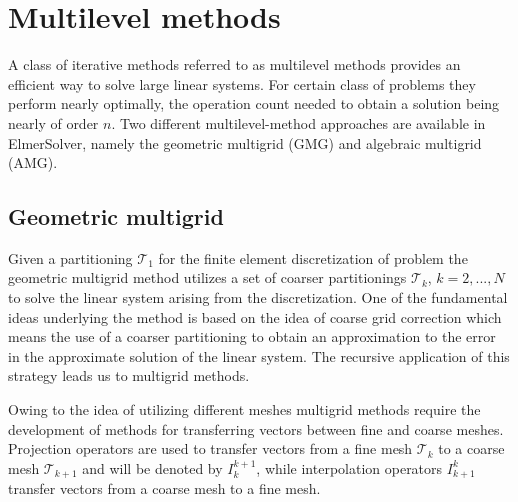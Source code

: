 


\section{Multilevel methods}

A class of iterative methods referred to as multilevel methods provides an efficient
way to solve large linear systems. For certain class of problems they perform nearly 
optimally, the operation count needed to obtain a solution being nearly of 
order $n$. Two different multilevel-method approaches are available in 
ElmerSolver, namely the geometric multigrid (GMG) and algebraic multigrid (AMG).  

\subsection{Geometric multigrid}

Given a partitioning $\mathcal{T}_1$ for the finite element discretization of problem the 
geometric multigrid method utilizes a set of coarser partitionings $\mathcal{T}_k$, 
$k=2,...,N$ to solve the linear system arising from the discretization.
One of the fundamental ideas underlying the method is based on the idea of 
coarse grid correction which means the use of a coarser partitioning to obtain an approximation 
to the error in the approximate solution of the linear system.
The recursive application of this strategy leads us to multigrid methods.  

Owing to the idea of utilizing different meshes  
multigrid methods require the development of methods for transferring vectors 
between fine and coarse meshes. Projection operators 
are used to transfer vectors from a fine mesh $\mathcal{T}_k$ to a coarse mesh 
$\mathcal{T}_{k+1}$ and will be denoted by $I_{k}^{k+1}$, while  
interpolation operators $I_{k+1}^{k}$ transfer vectors from a coarse mesh to a fine mesh.

